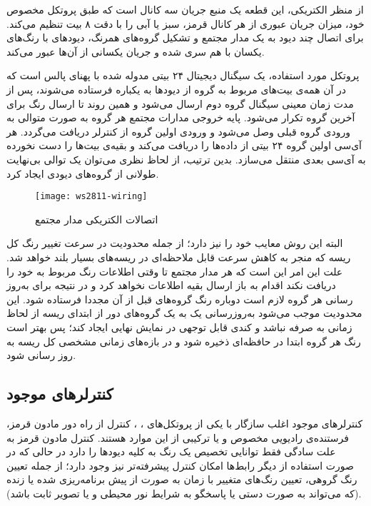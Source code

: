 \documentclass[12pt,twocolumn,a4paper,oneside]{article}
\begin{document}
از منظر الکتریکی، این قطعه یک منبع جریان سه کانال است که طبق پروتکل مخصوص خود، میزان جریان عبوری از هر کانال قرمز، سبز یا آبی را با دقت ۸ بیت تنظیم می‌کند. برای اتصال چند دیود به یک مدار مجتمع و تشکیل گروه‌های همرنگ، دیودهای با رنگ‌های یکسان با هم سری شده و جریان یکسانی از آن‌ها عبور می‌کند.

پروتکل مورد استفاده، یک سیگنال دیجیتال ۲۴ بیتی مدوله شده با پهنای پالس است که در آن همه‌ی بیت‌های مربوط به گروه از دیودها به یکباره فرستاده می‌شوند، پس از مدت زمان معینی سیگنال گروه دوم ارسال می‌شود و همین روند تا ارسال رنگ برای آخرین گروه تکرار می‌شود. پایه خروجی مدارات مجتمع هر گروه به صورت متوالی به ورودی گروه قبلی وصل می‌شود و ورودی اولین گروه از کنترلر دریافت می‌گردد. هر آی‌سی اولین گروه ۲۴ بیتی از داده‌ها را دریافت می‌کند و بقیه‌ی بیت‌ها را دست نخورده به آی‌سی بعدی منتقل می‌سازد. بدین ترتیب، از لحاظ نظری می‌توان یک توالی بی‌نهایت طولانی از گروه‌های دیودی ایجاد کرد.

\begin{figure}[ht]
\centering
\texttt{[image: ws2811-wiring]}
\caption{اتصالات الکتریکی مدار مجتمع \cite{ws2811:datasheet}}
\label{fig:ws2811-wiring}
\end{figure}

البته این روش معایب خود را نیز دارد؛ از جمله محدودیت در سرعت تغییر رنگ کل ریسه که منجر به کاهش سرعت قابل ملاحظه‌ای در ریسه‌های بسیار بلند خواهد شد. علت این امر این است که هر مدار مجتمع تا وقتی اطلاعات رنگ مربوط به خود را دریافت نکند اقدام به باز ارسال بقیه اطلاعات نخواهد کرد و در نتیجه برای به‌روز رسانی هر گروه لازم است دوباره رنگ گروه‌های قبل از آن مجددا فرستاده شود. این محدودیت موجب می‌شود به‌روزرسانی یک به یک گروه‌های دور از ابتدای ریسه از لحاظ زمانی به صرفه نباشد و کندی قابل توجهی در نمایش نهایی ایجاد کند؛ پس بهتر است رنگ هر گروه ابتدا در حافظه‌ای ذخیره شود و در بازه‌های زمانی مشخصی کل ریسه به روز رسانی شود.

\subsection{کنترلرهای موجود}
کنترلرهای موجود اغلب سازگار با یکی از پروتکل‌های
، ،
کنترل از راه دور مادون قرمز، فرستنده‌ی رادیویی مخصوص و یا ترکیبی از این موارد هستند. کنترل مادون قرمز به علت سادگی فقط توانایی تخصیص یک رنگ به کلیه دیودها را دارد در حالی که در صورت استفاده از دیگر رابط‌ها امکان کنترل پیشرفته‌تر نیز وجود دارد؛ از جمله تعیین رنگ گروهی، تعیین رنگ‌های متغییر با زمان به صورت از پیش برنامه‌ریزی شده یا زنده (که می‌تواند به صورت دستی یا پاسخگو به شرایط نور محیطی و یا تصویر ثابت باشد).
\end{document}
